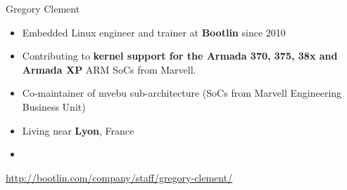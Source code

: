 \begin{frame}{Gregory Clement}
    \begin{itemize}
	\item Embedded Linux engineer and trainer at {\bf Bootlin}
              since 2010
	\item Contributing to {\bf kernel support for the Armada 370, 375, 38x and
	      Armada XP} ARM SoCs from Marvell.
	\item Co-maintainer of mvebu sub-architecture (SoCs from Marvell
    	      Engineering Business Unit)
	\item Living near {\bf Lyon}, France
	\item {}
    \end{itemize}
    {\small \url{http://bootlin.com/company/staff/gregory-clement/}}
\end{frame}
